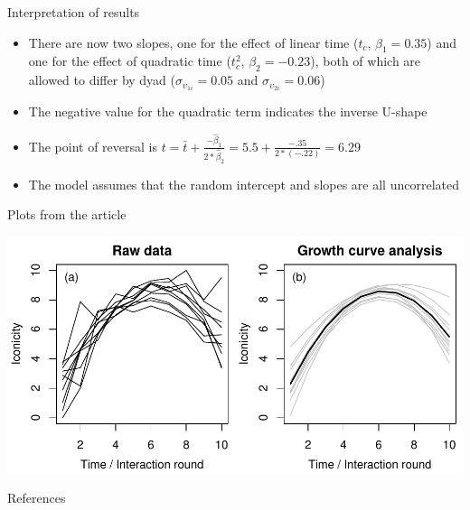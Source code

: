 \documentclass[aspectratio=169]{beamer}
\begin{document}
\begin{frame}{Interpretation of results}
\begin{itemize}
  \item There are now two slopes, one for the effect of linear time ($t_c$,
  $\beta_1 = 0.35$) and one for the effect of quadratic time ($t_c^2$,
  $\beta_2 = -0.23$), both of which are allowed to differ by dyad
  ($\sigma_{\upsilon_{1i}} = 0.05$ and $\sigma_{\upsilon_{2i}} = 0.06$)
  \item The negative value for the quadratic term indicates the inverse
  U-shape
  \item The point of reversal is $t = \bar t + \frac{-\hat\beta_1}{2*\hat\beta_2} =
  5.5 + \frac{-.35}{2*(-.22)} = 6.29$ \item The model assumes that the
  random intercept and slopes are all
  uncorrelated
\end{itemize}
\end{frame}

\begin{frame}{Plots from the article}
\begin{center}
\includegraphics[scale=.8]{../figures/icon-both}
\end{center}
\end{frame}

% 
% 

\appendix

\begin{frame}{References}
  \printbibliography
  \vfill
\end{frame}
 
\end{document}

